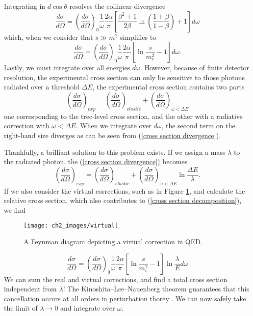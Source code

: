 \documentclass[10pt,a4paper]{book}
\begin{document}
Integrating in $d\cos\theta$ resolves the collinear divergence
\begin{equation}
\frac{d\sigma}{d\Omega} = \left(\frac{d\sigma}{d\Omega}\right)_0 \frac{1}{\omega} \frac{2\alpha}{\pi}\left[\frac{\beta^2 +1}{2\beta} \ln \left( \frac{1 + \beta}{1 - \beta}\right) +1 \right]d\omega
\end{equation}
which, when we consider that $s \gg m^2$ simplifies to
\begin{equation}
\frac{d\sigma}{d\Omega} = \left(\frac{d\sigma}{d\Omega}\right)_0 \frac{1}{\omega} \frac{2\alpha}{\pi}\left[\ln\frac{s}{m_e^2} - 1 \right] d\omega.
\label{cross section divergence}
\end{equation}
Lastly, we must integrate over all energies $d\omega$. However, because of finite detector resolution, the experimental cross section can only be sensitive to those photons radiated over a threshold $\Delta E$, the experimental cross section contains two parts
\begin{equation}
\left( \frac{d\sigma}{d\Omega}\right)_{exp} = \left( \frac{d\sigma}{d\Omega}\right)_{elastic} + \left( \frac{d\sigma}{d\Omega}\right)_{\omega < \Delta E}
\label{cross section decomposition}
\end{equation}
one corresponding to the tree-level cross section, and the other with a radiative correction with $\omega < \Delta E$. When we integrate over $d\omega$, the second term on the right-hand size diverges as can be seen from (\ref{cross section divergence}).

Thankfully, a brilliant solution to this problem exists. If we assign a mass $\lambda$ to the radiated photon, the (\ref{cross section divergence}) becomes
\begin{equation}
\left( \frac{d\sigma}{d\Omega}\right)_{exp} = \left( \frac{d\sigma}{d\Omega}\right)_{elastic} + \left( \frac{d\sigma}{d\Omega}\right)_{\omega < \Delta E}\ln \frac{\Delta E}{\lambda}.
\end{equation}
If we also consider the virtual corrections, such as in Figure \ref{virtual}, and calculate the relative cross section, which also contributes to (\ref{cross section decomposition}), we find
\begin{figure}
\centering
\texttt{[image: ch2\_images/virtual]}
\caption{A Feynman diagram depicting a virtual correction in QED.}
\label{virtual}
\end{figure}
\begin{equation}
\frac{d\sigma}{d\Omega} = \left(\frac{d\sigma}{d\Omega}\right)_0 \frac{1}{\omega} \frac{2\alpha}{\pi}\left[\ln\frac{s}{m_e^2} - 1 \right] \ln \frac{\lambda}{E} d\omega
\end{equation}
We can sum the real and virtual corrections, and find a total cross section independent from $\lambda$! The Kinoshita–Lee–Nauenberg theorem guarantees that this cancellation occurs at all orders in perturbation thorey \cite{Kinoshita:1962ur}. We can now safely take the limit of $\lambda \rightarrow 0$ and integrate over $\omega$.
\end{document}
